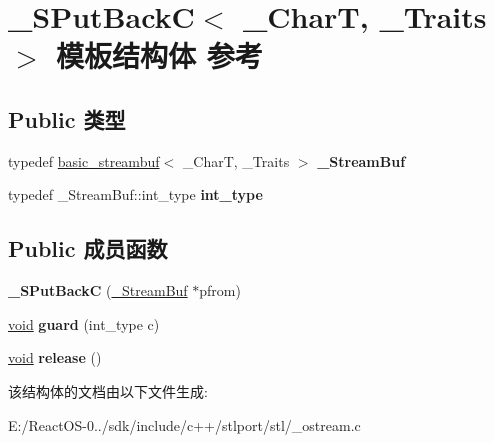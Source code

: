 \hypertarget{struct___s_put_back_c}{}\section{\+\_\+\+S\+Put\+BackC$<$ \+\_\+\+CharT, \+\_\+\+Traits $>$ 模板结构体 参考}
\label{struct___s_put_back_c}
\subsection*{Public 类型}
\begin{DoxyCompactItemize}
\item 
\mbox{\label{struct___s_put_back_c_aa01490e9c4b67f545fb2ada50adc6317}} 
typedef \hyperlink{classbasic__streambuf}{basic\+\_\+streambuf}$<$ \+\_\+\+CharT, \+\_\+\+Traits $>$ {\bfseries \+\_\+\+Stream\+Buf}
\item 
\mbox{\label{struct___s_put_back_c_a89ad3e4d5c837f638ffd5f793a9a9cd7}} 
typedef \+\_\+\+Stream\+Buf\+::int\+\_\+type {\bfseries int\+\_\+type}
\end{DoxyCompactItemize}
\subsection*{Public 成员函数}
\begin{DoxyCompactItemize}
\item 
\mbox{\label{struct___s_put_back_c_acb60807accda27fa8200fad3381d64b2}} 
{\bfseries \+\_\+\+S\+Put\+BackC} (\hyperlink{classbasic__streambuf}{\+\_\+\+Stream\+Buf} $\ast$pfrom)
\item 
\mbox{\label{struct___s_put_back_c_aeb266041d7e3c3c56b2913cc32edf90d}} 
\hyperlink{interfacevoid}{void} {\bfseries guard} (int\+\_\+type c)
\item 
\mbox{\label{struct___s_put_back_c_a44aac18db2b9f2da4627909e432aba42}} 
\hyperlink{interfacevoid}{void} {\bfseries release} ()
\end{DoxyCompactItemize}


该结构体的文档由以下文件生成\+:\begin{DoxyCompactItemize}
\item 
E\+:/\+React\+O\+S-\/0../sdk/include/c++/stlport/stl/\+\_\+ostream.\+c\end{DoxyCompactItemize}
